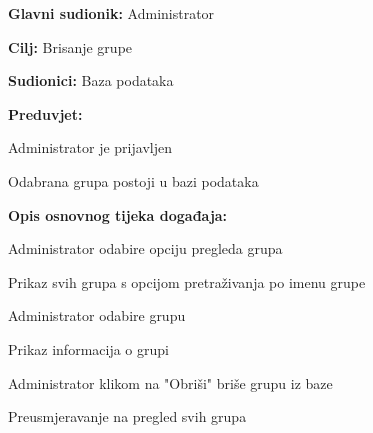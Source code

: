 \documentclass[times, utf8, zavrsni]{fer}
\newenvironment{packed_enum}{
	\begin{enumerate}
		\setlength{\itemsep}{0pt}
		\setlength{\parskip}{0pt}
		\setlength{\parsep}{0pt}
	}{\end{enumerate}}
\newenvironment{packed_item}{
	\begin{itemize}
		\setlength{\itemsep}{0pt}
		\setlength{\parskip}{0pt}
		\setlength{\parsep}{0pt}
	}{\end{itemize}}
\begin{document}
			\noindent {}
					\begin{packed_item}
						
						\item \textbf{Glavni sudionik: } Administrator
						\item  \textbf{Cilj:} Brisanje grupe
						\item  \textbf{Sudionici:} Baza podataka
						\item  \textbf{Preduvjet:} 
						
						\item[] \begin{packed_enum}
							
							\item Administrator je prijavljen
							\item Odabrana grupa postoji u bazi podataka
							
							
						\end{packed_enum}
						
						\item  \textbf{Opis osnovnog tijeka događaja:}
						
						\item[] \begin{packed_enum}
							
							\item Administrator odabire opciju pregleda grupa
							\item Prikaz svih grupa s opcijom pretraživanja po imenu grupe
							\item Administrator odabire grupu
							\item Prikaz informacija o grupi
							\item Administrator klikom na "Obriši" briše grupu iz baze
							\item Preusmjeravanje na pregled svih grupa
							
							
						\end{packed_enum}
						
					\end{packed_item}
					
\end{document}
